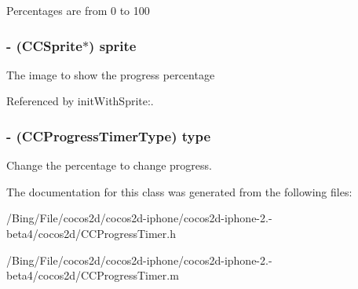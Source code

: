 Percentages are from 0 to 100 \hypertarget{interface_c_c_progress_timer_ae6a83da6df7deb44ff9cf3903a7c8626}{
\subsubsection[{sprite}]{\setlength{\rightskip}{0pt plus 5cm}-\/ ({\bf C\-C\-Sprite}$\ast$) {\bf sprite}}}\label{interface_c_c_progress_timer_ae6a83da6df7deb44ff9cf3903a7c8626}
The image to show the progress percentage 

Referenced by init\-With\-Sprite\-:.

\hypertarget{interface_c_c_progress_timer_a86e12846b4c18ed4fca9f63f58c1234d}{
\subsubsection[{type}]{\setlength{\rightskip}{0pt plus 5cm}-\/ (C\-C\-Progress\-Timer\-Type) {\bf type}}}\label{interface_c_c_progress_timer_a86e12846b4c18ed4fca9f63f58c1234d}
Change the percentage to change progress. 

The documentation for this class was generated from the following files\-:\begin{DoxyCompactItemize}
\item 
/\-Bing/\-File/cocos2d/cocos2d-\/iphone/cocos2d-\/iphone-\/2.-\/beta4/cocos2d/C\-C\-Progress\-Timer.\-h\item 
/\-Bing/\-File/cocos2d/cocos2d-\/iphone/cocos2d-\/iphone-\/2.-\/beta4/cocos2d/C\-C\-Progress\-Timer.\-m\end{DoxyCompactItemize}
